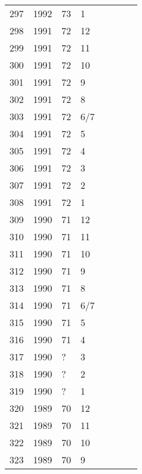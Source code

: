 \begin{longtable}{ |l|l|l|l|l|l|l|l| }
297 & 1992 & 73 &     1 &         &                &  & \\
298 & 1991 & 72 &    12 &         &                &  & \\
299 & 1991 & 72 &    11 &         &                &  & \\
300 & 1991 & 72 &    10 &         &                &  & \\
301 & 1991 & 72 &     9 &         &                &  & \\
302 & 1991 & 72 &     8 &         &                &  & \\
303 & 1991 & 72 &   6/7 &         &                &  & \\
304 & 1991 & 72 &     5 &         &                &  & \\
305 & 1991 & 72 &     4 &         &                &  & \\
306 & 1991 & 72 &     3 &         &                &  & \\
307 & 1991 & 72 &     2 &         &                &  & \\
308 & 1991 & 72 &     1 &         &                &  & \\
309 & 1990 & 71 &    12 &         &                &  & \\
310 & 1990 & 71 &    11 &         &                &  & \\
311 & 1990 & 71 &    10 &         &                &  & \\
312 & 1990 & 71 &     9 &         &                &  & \\
313 & 1990 & 71 &     8 &         &                &  & \\
314 & 1990 & 71 &   6/7 &         &                &  & \\
315 & 1990 & 71 &     5 &         &                &   & \\
316 & 1990 & 71 &     4 &         &                &  & \\
317 & 1990 & ?  &     3 &         &                &  & \\
318 & 1990 & ?  &     2 &         &                &  & \\
319 & 1990 & ?  &     1 &         &                &  & \\
320 & 1989 & 70 &    12 &         &                &   & \\
321 & 1989 & 70 &    11 &         &                &  & \\
322 & 1989 & 70 &    10 &         &                &  & \\
323 & 1989 & 70 &     9 &         &                &  & \\

\end{longtable}
